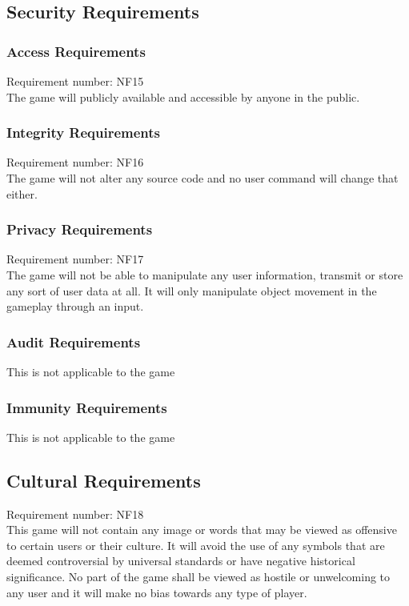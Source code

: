 \documentclass[12pt, titlepage]{article}
\begin{document}
\subsection{Security Requirements}

\subsubsection{Access Requirements}
Requirement number: NF15
\\The game will publicly available and accessible by anyone in the public.

\subsubsection{Integrity Requirements}
Requirement number: NF16
\\The game will not alter any source code and no user command will change that either.

\subsubsection{Privacy Requirements}
Requirement number: NF17
\\The game will not be able to manipulate any user information, transmit or store any sort of user data at all. It will only manipulate object movement in the gameplay through an input. 

\subsubsection{Audit Requirements}
This is not applicable to the game

\subsubsection{Immunity Requirements}
This is not applicable to the game

\subsection{Cultural Requirements}
Requirement number: NF18
\\This game will not contain any image or words that may be viewed as offensive to certain users or their culture. It will avoid the use of any symbols that are deemed controversial by universal standards or have negative historical significance. No part of the game shall be viewed as hostile or unwelcoming to any user and it will make no bias towards any type of player. 
\end{document}
